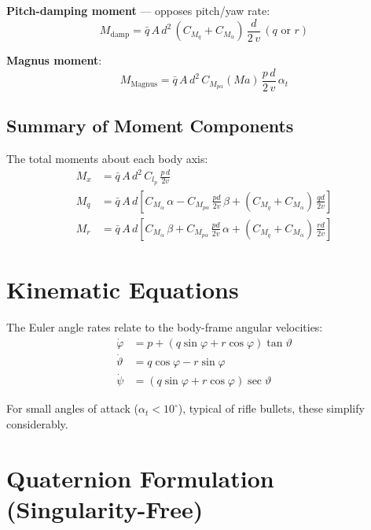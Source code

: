 \documentclass[11pt,twoside,openright]{report}
\newcommand{\Mach}{\mathit{Ma}}
\begin{document}
\textbf{Pitch-damping moment} --- opposes pitch/yaw rate:
\begin{equation}
  M_{\mathrm{damp}} = \bar{q}\,A\,d^2\,\left(C_{M_q} + C_{M_{\dot{\alpha}}}\right)\,\frac{d}{2\,v}\,(q \text{ or } r)
  \label{eq:pitch_damping}
\end{equation}

\textbf{Magnus moment}:
\begin{equation}
  M_{\mathrm{Magnus}} = \bar{q}\,A\,d^2\,C_{M_{p\alpha}}(\Mach)\,\frac{p\,d}{2\,v}\,\alpha_t
  \label{eq:magnus_moment}
\end{equation}

\subsection{Summary of Moment Components}

The total moments about each body axis:
\begin{align}
  M_x &= \bar{q}\,A\,d^2\,C_{l_p}\,\frac{p\,d}{2v} \label{eq:Mx}\\
  M_q &= \bar{q}\,A\,d\left[C_{M_\alpha}\,\alpha - C_{M_{p\alpha}}\,\frac{pd}{2v}\,\beta + (C_{M_q}+C_{M_{\dot{\alpha}}})\,\frac{qd}{2v}\right] \label{eq:Mq}\\
  M_r &= \bar{q}\,A\,d\left[C_{M_\alpha}\,\beta + C_{M_{p\alpha}}\,\frac{pd}{2v}\,\alpha + (C_{M_q}+C_{M_{\dot{\alpha}}})\,\frac{rd}{2v}\right] \label{eq:Mr}
\end{align}

\section{Kinematic Equations}

The Euler angle rates relate to the body-frame angular velocities:
\begin{align}
  \dot{\varphi} &= p + (q\sin\varphi + r\cos\varphi)\tan\vartheta \label{eq:kin_phi}\\
  \dot{\vartheta} &= q\cos\varphi - r\sin\varphi \label{eq:kin_theta}\\
  \dot{\psi} &= (q\sin\varphi + r\cos\varphi)\sec\vartheta \label{eq:kin_psi}
\end{align}

For small angles of attack ($\alpha_t < 10^{\circ}$), typical of rifle bullets, these simplify considerably.

\section{Quaternion Formulation (Singularity-Free)}
\end{document}
